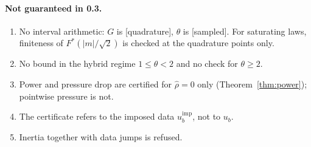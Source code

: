 \documentclass[11pt]{article}
\theoremstyle{definition}
\begin{document}
\paragraph{Not guaranteed in 0.3.}
\begin{enumerate}
\item No interval arithmetic: $G$ is [quadrature], $\theta$ is [sampled]. For saturating laws, finiteness of
$F^*(|m|/\sqrt2)$ is checked at the quadrature points only.
\item No bound in the hybrid regime $1\le\theta<2$ and no check for $\theta\ge2$.
\item Power and pressure drop are certified for $\hat\rho=0$ only (Theorem~\ref{thm:power}); pointwise pressure is not.
\item The certificate refers to the imposed data $u_b^{\mathrm{imp}}$, not to $u_b$.
\item Inertia together with data jumps is refused.
\end{enumerate}
\end{document}

